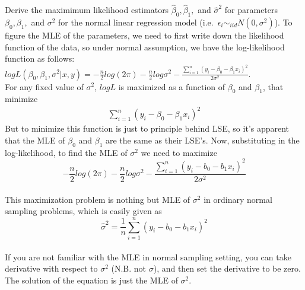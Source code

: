\documentclass[12pt]{article}
\begin{document}
 { Derive the maximimum likelihood estimators $\hat
\beta_0, \hat \beta_1,$ and $\hat \sigma^2$ for parameters $\beta_0,
\beta_1,$ and $\sigma^2$ for the normal linear regression model
(i.e.~$\epsilon_i \sim_{iid} N(0,\sigma^2)$). } { \vfill
  \answer
}
{
To figure the MLE of the parameters, we need to first write down
the likelihood function of the data, so under normal assumption, we
have the log-likelihood function as follows:\\
$logL(\beta_0,\beta_1,\sigma^2|x,y)=-\frac{n}{2}log(2\pi)-\frac{n}{2}log\sigma^2-\frac{\displaystyle\sum_{i=1}^{n}(y_i-\beta_0-\beta_1x_i)^2}{2\sigma^2}.$\\
For any fixed value of $\sigma^2$, $logL$ is maximized as a function
of $\beta_0$ and $\beta_1$, that minimize
\begin{eqnarray}
\displaystyle\sum_{i=1}^{n}(y_i-\beta_0-\beta_1x_i)^2
\end{eqnarray}
But to minimize this function is just to principle behind LSE, so
it's apparent that the MLE of $\beta_0$ and $\beta_1$ are the same
as their LSE's. Now, substituting in the log-likelihood, to find the
MLE of $\sigma^2$ we need to maximize\\
\[-\frac{n}{2}log(2\pi)-\frac{n}{2}log\sigma^2-\frac{\displaystyle\sum_{i=1}^{n}(y_i-b_0-b_1x_i)^2}{2\sigma^2}\]\\
This maximization problem is nothing but MLE of $\sigma^2$ in
ordinary normal sampling problems, which is easily given as\\
\[\hat{\sigma}^2=\frac{1}{n}\displaystyle\sum_{i=1}^{n}(y_i-b_0-b_1x_i)^2\]\\
If you are not familiar with the MLE in normal sampling setting, you
can take derivative with respect to $\sigma^2$ (N.B. not $\sigma$),
and then set the derivative to be zero. The solution of the equation
is just the MLE of $\sigma^2$.\\
}
\end{document}
